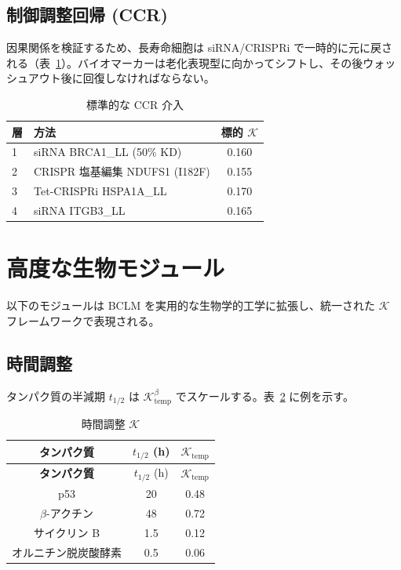 \documentclass[12pt,a4paper]{ltjsarticle}
\newcommand{\REL}{\mathcal{K}}          %
\begin{document}
	\subsection{制御調整回帰 (CCR)}
	因果関係を検証するため、長寿命細胞は siRNA/CRISPRi で一時的に元に戻される（表~\ref{tab:CCR}）。バイオマーカーは老化表現型に向かってシフトし、その後ウォッシュアウト後に回復しなければならない。
	
	\begin{table}[H]
		\centering
		\caption{標準的な CCR 介入}
		\label{tab:CCR}
		\begin{tabular}{@{}llc@{}}
			\toprule
			\textbf{層} & \textbf{方法} & \textbf{標的 \(\REL\)} \\
			\midrule
			1 & siRNA BRCA1\_LL (50\% KD) & 0.160 \\
			2 & CRISPR 塩基編集 NDUFS1 (I182F) & 0.155 \\
			3 & Tet‑CRISPRi HSPA1A\_LL & 0.170 \\
			4 & siRNA ITGB3\_LL & 0.165 \\
			\bottomrule
		\end{tabular}
	\end{table}
	
	\section{高度な生物モジュール}
	\label{sec:modules}
	以下のモジュールは BCLM を実用的な生物学的工学に拡張し、統一された \(\REL\) フレームワークで表現される。
	
	\subsection{時間調整}
	タンパク質の半減期 \(t_{1/2}\) は \(\REL_{\mathrm{temp}}^{\beta}\) でスケールする。表~\ref{tab:temporal} に例を示す。
	
	\begin{longtable}{|c|c|c|}
		\caption{時間調整 \(\REL\)}\label{tab:temporal}\\
		\hline
		\textbf{タンパク質} & \(t_{1/2}\) (h) & \(\REL_{\mathrm{temp}}\) \\
		\hline
		\endfirsthead
		\hline
		\textbf{タンパク質} & \(t_{1/2}\) (h) & \(\REL_{\mathrm{temp}}\) \\
		\hline
		\endhead
		\hline
		p53 & 20 & 0.48 \\
		\(\beta\)-アクチン & 48 & 0.72 \\
		サイクリン B & 1.5 & 0.12 \\
		オルニチン脱炭酸酵素 & 0.5 & 0.06 \\
		\hline
	\end{longtable}
	
\end{document}
